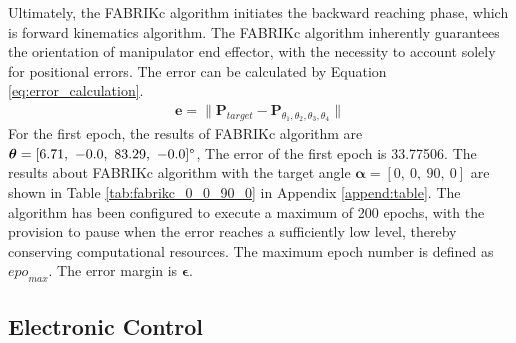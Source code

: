 Ultimately, the FABRIKc algorithm initiates the backward reaching phase, which is forward kinematics algorithm. The 
FABRIKc algorithm inherently guarantees the orientation of manipulator end effector,  with the necessity to account 
solely for positional errors. The error can be calculated by Equation \ref{eq:error_calculation}.
\begin{align}
    \textbf{e} = \lVert\textbf{P}_{target} - \textbf{P}_{\theta_1, \theta_2, \theta_3, \theta_4}\rVert
    \label{eq:error_calculation}
\end{align}
For the first epoch, the results of FABRIKc algorithm are 
$\boldsymbol{\theta} = [6.71,\ -0.0,\ 83.29,\ -0.0]\degree $, 
The error of the first epoch is 33.77506. The results about FABRIKc algorithm with the target angle 
$\boldsymbol{\alpha} = [0,\ 0,\ 90,\ 0] $ are shown in Table \ref{tab:fabrikc_0_0_90_0} 
in Appendix \ref{append:table}. The algorithm has been configured to execute a maximum of 200 epochs, with 
the provision to pause when the error reaches a sufficiently low level, thereby conserving computational resources. 
The maximum epoch number is defined as ${epo}_{max}$. The error margin is $\boldsymbol{\epsilon}$.

\subsection{Electronic Control}
